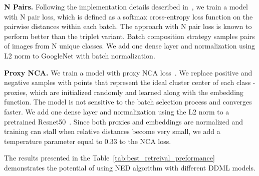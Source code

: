 \documentclass{article}
\begin{document}
\textbf{N Pairs.}  Following the implementation details described in~\cite{b2},
we train a model with N pair loss, which is defined as a
softmax cross-entropy loss function on the pairwise distances
within each batch. The approach with N pair loss is known
to perform better than the triplet variant. Batch composition
strategy samples pairs of images from N unique classes. We
add one dense layer and normalization using L2 norm to
GoogleNet with batch normalization.

\textbf{Proxy NCA.} We train a model with proxy NCA loss~\cite{b1}. We replace
positive and negative samples with points that represent the
ideal cluster center of each class - proxies, which are initialized
randomly and learned along with the embedding function.
The model is not sensitive to the batch selection process
and converges faster. We add one dense layer and normalization
using the L2 norm to a pretrained Resnet50~\cite{b62}. Since
both proxies and embeddings are normalized and training
can stall when relative distances become very small, we add
a temperature parameter equal to 0.33 to the NCA loss.

The results presented in the Table~\ref{tab:best_retreival_preformance} demonstrates the potential of using NED algorithm with different DDML models.
\end{document}
